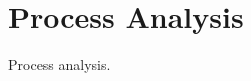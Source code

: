 \documentclass[../main.tex]{subfiles}
\begin{document}
    \chapter{Process Analysis}\label{ch:process-analysis}

    Process analysis.
\end{document}
